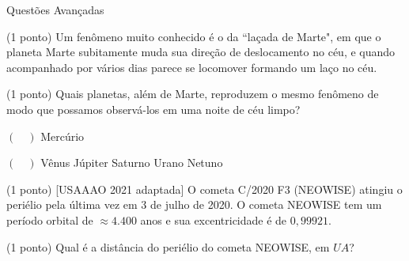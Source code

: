\documentclass{../lista}
\begin{document}
	\begin{secao}{Questões Avançadas}
		\begin{questao}{(1 ponto)}
			Um fenômeno muito conhecido é o da ``laçada de Marte", em que o planeta Marte subitamente muda sua direção de deslocamento no céu, e quando acompanhado por vários dias parece se locomover formando um laço no céu.

			\begin{pergunta}{(1 ponto)}
				Quais planetas, além de Marte, reproduzem o mesmo fenômeno de modo que possamos observá-los em uma noite de céu limpo?


				\begin{multicols}{3}
					\begin{alternativas}
						\item[$(\quad)$] Mercúrio
						\item[$(\quad)$] Vênus
						\alternativaMarcada Júpiter
						\alternativaMarcada Saturno
						\alternativaMarcada Urano
						\alternativaMarcada Netuno
					\end{alternativas}
				\end{multicols}
			\end{pergunta}
		\end{questao}

		\begin{questao}{(1 ponto) [USAAAO 2021 adaptada]}
			O cometa C/2020 F3 (NEOWISE) atingiu o periélio pela última vez em 3 de julho de 2020. O cometa NEOWISE tem um período orbital de $\approx 4.400$ anos e sua excentricidade é de $0,99921$.

			\begin{pergunta}{(1 ponto)}
				Qual é a distância do periélio do cometa NEOWISE, em $UA$?



\end{pergunta}
\end{questao}
\end{secao}
\end{document}

